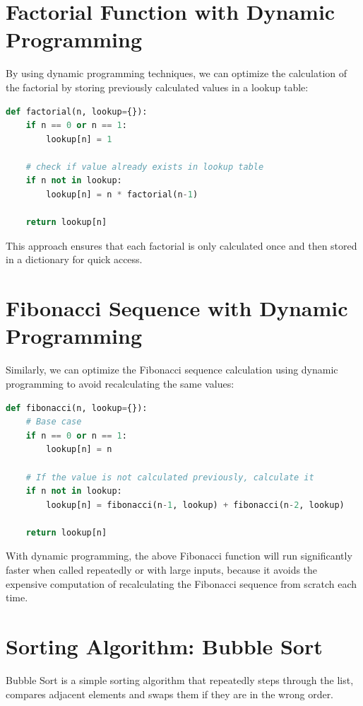 \documentclass[12pt]{book}
\begin{document}
\section{Factorial Function with Dynamic Programming}
By using dynamic programming techniques, we can optimize the calculation of the factorial by storing previously calculated values in a lookup table:

\begin{lstlisting}[language=Python]
def factorial(n, lookup={}):
    if n == 0 or n == 1:
        lookup[n] = 1

    # check if value already exists in lookup table
    if n not in lookup:
        lookup[n] = n * factorial(n-1)

    return lookup[n]
\end{lstlisting}

This approach ensures that each factorial is only calculated once and then stored in a dictionary for quick access.

\section{Fibonacci Sequence with Dynamic Programming}
Similarly, we can optimize the Fibonacci sequence calculation using dynamic programming to avoid recalculating the same values:

\begin{lstlisting}[language=Python]
def fibonacci(n, lookup={}):
    # Base case
    if n == 0 or n == 1:
        lookup[n] = n

    # If the value is not calculated previously, calculate it
    if n not in lookup:
        lookup[n] = fibonacci(n-1, lookup) + fibonacci(n-2, lookup)

    return lookup[n]
\end{lstlisting}

With dynamic programming, the above Fibonacci function will run significantly faster when called repeatedly or with large inputs, because it avoids the expensive computation of recalculating the Fibonacci sequence from scratch each time.

\section{Sorting Algorithm: Bubble Sort}
Bubble Sort is a simple sorting algorithm that repeatedly steps through the list, compares adjacent elements and swaps them if they are in the wrong order.
\end{document}

